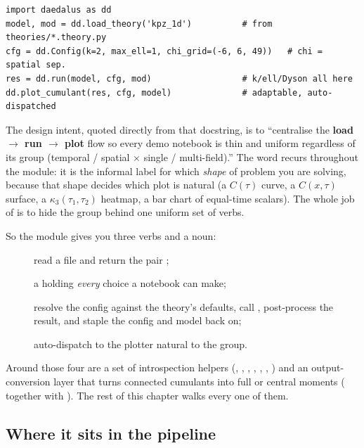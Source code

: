 \begin{lstlisting}
import daedalus as dd
model, mod = dd.load_theory('kpz_1d')          # from theories/*.theory.py
cfg = dd.Config(k=2, max_ell=1, chi_grid=(-6, 6, 49))   # chi = spatial sep.
res = dd.run(model, cfg, mod)                  # k/ell/Dyson all here
dd.plot_cumulant(res, cfg, model)              # adaptable, auto-dispatched
\end{lstlisting}

The design intent, quoted directly from that docstring, is to
``centralise the \textbf{load $\to$ run $\to$ plot} flow so every demo notebook
is thin and uniform regardless of its group (temporal / spatial $\times$ single /
multi-field).'' The word  recurs throughout the module: it is the
informal label for which \emph{shape} of problem you are solving, because that
shape decides which plot is natural (a $C(\tau)$ curve, a $C(x,\tau)$ surface, a
$\kappa_3(\tau_1,\tau_2)$ heatmap, a bar chart of equal-time scalars). The whole
job of  is to hide the group behind one uniform set of verbs.

So the module gives you three verbs and a noun:

\begin{description}
  \item[] read a  file
        and return the pair ;
  \item[] a  holding \emph{every} choice a
        notebook can make;
  \item[] resolve the config against the theory's
        defaults, call , post-process the result, and
        staple the config and model back on;
  \item[] auto-dispatch to the
        plotter natural to the group.
\end{description}

Around those four are a set of introspection helpers
(, , ,
, , ,
) and an output-conversion layer that turns connected
cumulants into full or central moments ( together with
). The rest of this chapter walks every one of
them.

\subsection{Where it sits in the pipeline}

